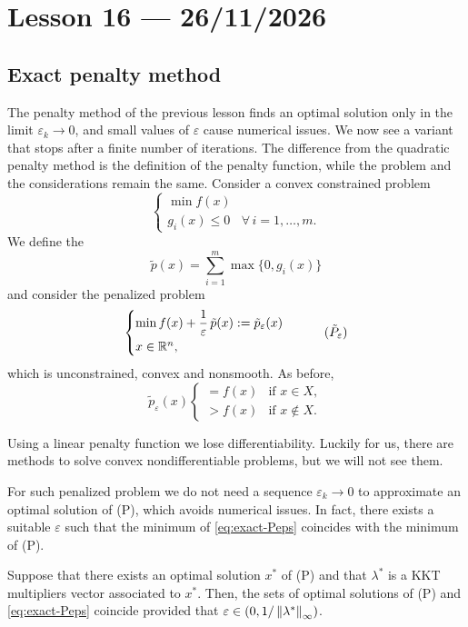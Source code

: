 \section{Lesson 16 --- 26/11/2026}

\subsection{Exact penalty method}
The penalty method of the previous lesson finds an optimal solution only in the limit $\varepsilon_k \to 0$, and small values of $\varepsilon$ cause numerical issues. We now see a variant that stops after a finite number of iterations. The difference from the quadratic penalty method is the definition of the penalty function, while the problem and the considerations remain the same. Consider a convex constrained problem
\[
\begin{cases}
\min f(x)\\
g_i(x) \le 0 & \forall\, i=1,\dots,m.
\end{cases}
\tag{P}
\]
We define the 
\[
\tilde p(x) = \sum_{i=1}^{m} \max\{0, g_i(x)\}
\]
and consider the penalized problem
\begin{equation}\label{eq:exact-Peps}
\begin{cases}
\displaystyle \min f(x) + \frac{1}{\varepsilon}\, \tilde p(x) := \tilde p_\varepsilon(x)\\[1ex]
x \in \mathbb{R}^n,
\end{cases}
\tag{$\tilde P_\varepsilon$}
\end{equation}
which is unconstrained, convex and nonsmooth. As before,
\[
\tilde p_\varepsilon(x)
\begin{cases}
= f(x) & \text{if } x \in X,\\
> f(x) & \text{if } x \notin X.
\end{cases}
\]

Using a linear penalty function we lose differentiability. Luckily for us, there are methods to solve convex nondifferentiable problems, but we will not see them.

For such penalized problem we do not need a sequence $\varepsilon_k \to 0$ to approximate an optimal solution of (P), which avoids numerical issues. In fact, there exists a suitable $\varepsilon$ such that the minimum of \eqref{eq:exact-Peps} coincides with the minimum of (P).

\begin{proposition}
Suppose that there exists an optimal solution $x^*$ of (P) and that $\lambda^*$ is a KKT multipliers vector associated to $x^*$. Then, the sets of optimal solutions of (P) and \eqref{eq:exact-Peps} coincide provided that $\varepsilon \in (0, 1/\left\lVert \lambda^* \right\rVert_\infty)$.
\end{proposition}

